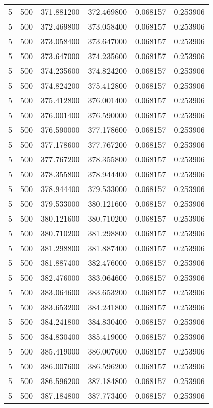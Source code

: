 \begin{longtable}{rrrrrr}
5 & 500 & 371.881200 & 372.469800 & 0.068157 & 0.253906 \\
5 & 500 & 372.469800 & 373.058400 & 0.068157 & 0.253906 \\
5 & 500 & 373.058400 & 373.647000 & 0.068157 & 0.253906 \\
5 & 500 & 373.647000 & 374.235600 & 0.068157 & 0.253906 \\
5 & 500 & 374.235600 & 374.824200 & 0.068157 & 0.253906 \\
5 & 500 & 374.824200 & 375.412800 & 0.068157 & 0.253906 \\
5 & 500 & 375.412800 & 376.001400 & 0.068157 & 0.253906 \\
5 & 500 & 376.001400 & 376.590000 & 0.068157 & 0.253906 \\
5 & 500 & 376.590000 & 377.178600 & 0.068157 & 0.253906 \\
5 & 500 & 377.178600 & 377.767200 & 0.068157 & 0.253906 \\
5 & 500 & 377.767200 & 378.355800 & 0.068157 & 0.253906 \\
5 & 500 & 378.355800 & 378.944400 & 0.068157 & 0.253906 \\
5 & 500 & 378.944400 & 379.533000 & 0.068157 & 0.253906 \\
5 & 500 & 379.533000 & 380.121600 & 0.068157 & 0.253906 \\
5 & 500 & 380.121600 & 380.710200 & 0.068157 & 0.253906 \\
5 & 500 & 380.710200 & 381.298800 & 0.068157 & 0.253906 \\
5 & 500 & 381.298800 & 381.887400 & 0.068157 & 0.253906 \\
5 & 500 & 381.887400 & 382.476000 & 0.068157 & 0.253906 \\
5 & 500 & 382.476000 & 383.064600 & 0.068157 & 0.253906 \\
5 & 500 & 383.064600 & 383.653200 & 0.068157 & 0.253906 \\
5 & 500 & 383.653200 & 384.241800 & 0.068157 & 0.253906 \\
5 & 500 & 384.241800 & 384.830400 & 0.068157 & 0.253906 \\
5 & 500 & 384.830400 & 385.419000 & 0.068157 & 0.253906 \\
5 & 500 & 385.419000 & 386.007600 & 0.068157 & 0.253906 \\
5 & 500 & 386.007600 & 386.596200 & 0.068157 & 0.253906 \\
5 & 500 & 386.596200 & 387.184800 & 0.068157 & 0.253906 \\
5 & 500 & 387.184800 & 387.773400 & 0.068157 & 0.253906 \\

\end{longtable}

